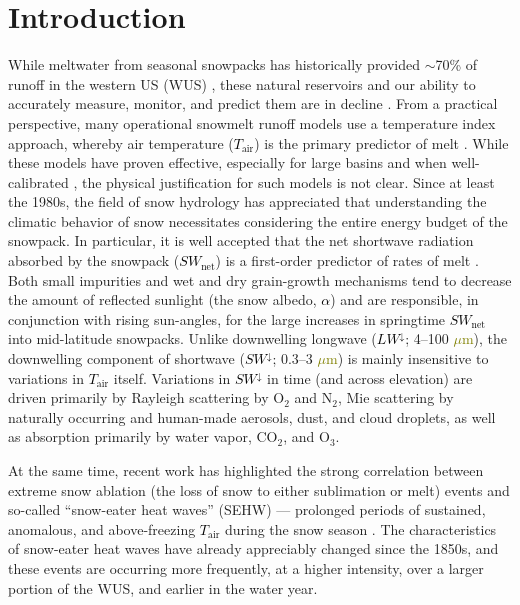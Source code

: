 \documentclass[draft]{agujournal2019}
\newcommand{\tair}{\textcolor{black}{$T_{\mathrm{air}}$}\xspace}
\newcommand{\lwdn}{\textcolor{black}{$LW^{\downarrow}$}\xspace}
\newcommand{\swnet}{\textcolor{black}{$SW_{\mathrm{net}}$}\xspace}
\newcommand{\swdn}{\textcolor{black}{$SW^{\downarrow}$}\xspace}
\newcommand{\albedo}{\textcolor{black}{$\alpha$}\xspace}
\newcommand{\um}{\textcolor{olive}{$\mu$m}\xspace}
\begin{document}
\section{Introduction}
While meltwater from seasonal snowpacks has historically provided $\sim$70\% of runoff in the western US (WUS) \cite{Li2017-dj}, these natural reservoirs and our ability to accurately measure, monitor, and predict them are in decline \cite{Hale2023-kx, Cowherd2024-zm}.
From a practical perspective, many operational snowmelt runoff models use a temperature index approach, whereby air temperature (\tair) is the primary predictor of melt \cite{Anderson1973-jx}.
While these models have proven effective, especially for large basins and when well-calibrated \cite{REIS-model}, the physical justification for such models is not clear.
Since at least the 1980s, the field of snow hydrology has appreciated that understanding the climatic behavior of snow necessitates considering the entire energy budget of the snowpack.
In particular, it is well accepted that the net shortwave radiation absorbed by the snowpack (\swnet) is a first-order predictor of rates of melt \cite{Marks1992-qo, Cline1997-de}.
Both small impurities \cite{Deems2013-vv, Skiles2018-ih} and wet and dry grain-growth mechanisms \cite{Colbeck1982-gv} tend to decrease the amount of reflected sunlight (the snow albedo, \albedo) and are responsible, in conjunction with rising sun-angles, for the large increases in springtime \swnet into mid-latitude snowpacks.
Unlike downwelling longwave (\lwdn; 4--100 \um), the downwelling component of shortwave (\swdn; 0.3--3 \um) is mainly insensitive to variations in \tair itself.
Variations in \swdn in time (and across elevation) are driven primarily by Rayleigh scattering by O$_2$ and N$_2$, Mie scattering by naturally occurring and human-made aerosols, dust, and cloud droplets, as well as absorption primarily by water vapor, CO$_2$, and O$_3$.

At the same time, recent work has highlighted the strong correlation between extreme snow ablation (the loss of snow to either sublimation or melt) events and so-called ``snow-eater heat waves'' (SEHW) --- prolonged periods of sustained, anomalous, and above-freezing \tair during the snow season \cite{Rhoades2026-jm}.
The characteristics of snow-eater heat waves have already appreciably changed since the 1850s, and these events are occurring more frequently, at a higher intensity, over a larger portion of the WUS, and earlier in the water year.
\end{document}
